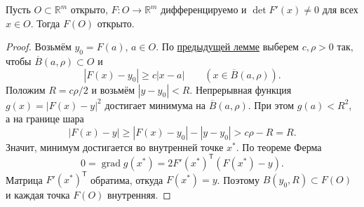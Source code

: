 \label{ticket:14}

\begin{theorem}
Пусть $O\subset\mathbb R^m$ открыто, $F:O\to\mathbb R^m$ дифференцируемо и $\det F'(x)\ne0$ для всех $x\in O$.
Тогда $F(O)$ открыто.
\end{theorem}

\begin{proof}
Возьмём $y_0=F(a)$, $a\in O$.
По \hyperref[ticket:13]{предыдущей лемме} выберем $c,\rho>0$ так, чтобы $\overline B(a,\rho)\subset O$ и
\[
  |F(x)-y_0|\ge c|x-a|\qquad(x\in\overline B(a,\rho)).
\]
Положим $R=c\rho/2$ и возьмём $|y-y_0|<R$.
Непрерывная функция $g(x)=|F(x)-y|^2$ достигает минимума на $\overline B(a,\rho)$.
При этом $g(a)<R^2$, а на границе шара
\[
  |F(x)-y|\ge|F(x)-y_0|-|y-y_0|>c\rho-R=R.
\]
Значит, минимум достигается во внутренней точке $x^*$.
По теореме Ферма
\[
  0=\operatorname{grad}g(x^*)
    =2F'(x^*)^{\mathsf T}(F(x^*)-y).
\]
Матрица $F'(x^*)^{\mathsf T}$ обратима, откуда $F(x^*)=y$.
Поэтому $B(y_0,R)\subset F(O)$ и каждая точка $F(O)$ внутренняя.
\end{proof}

